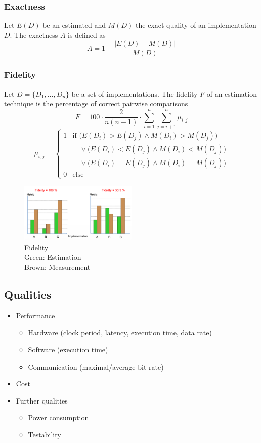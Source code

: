 \subsubsection{Exactness}
Let $E(D)$ be an estimated and $M(D)$ the exact quality of an implementation $D$. The exactness $A$ is defined as
$$
	A=1-\frac{|E(D)-M(D)|}{M(D)}
$$

\subsubsection{Fidelity}
Let $D=\{D_1, \dots, D_n\}$ be a set of implementations. The fidelity $F$ of an estimation technique is the percentage of correct pairwise comparisons
$$
	F=100\cdot\frac{2}{n(n-1)}\cdot\sum_{i=1}^n\sum_{j=i+1}^n\mu_{i,j}
$$
\[
\mu_{i,j} =
\begin{cases}
1 & \text{if } 
\bigl(E(D_i) > E(D_j) \land M(D_i) > M(D_j)\bigr) \\
 & \quad \lor \bigl(E(D_i) < E(D_j) \land M(D_i) < M(D_j)\bigr) \\
 & \quad \lor \bigl(E(D_i) = E(D_j) \land M(D_i) = M(D_j)\bigr) \\
0 & \text{else}
\end{cases}
\]

\begin{figure}[h]
	\begin{center}
		\includegraphics[width=0.5\textwidth]{images/Fidelity.png}
		\caption{Fidelity \\ Green: Estimation \\ Brown: Measurement}
	\end{center}
\end{figure}

\subsection{Qualities}
\begin{itemize}
	\item Performance
\begin{itemize}
	\item Hardware (clock period, latency, execution time, data rate)
	\item Software (execution time)
	\item Communication (maximal/average bit rate)
\end{itemize}
	\item Cost
	\item Further qualities
\begin{itemize}
	\item Power consumption
	\item Testability 
\end{itemize}
\end{itemize}

